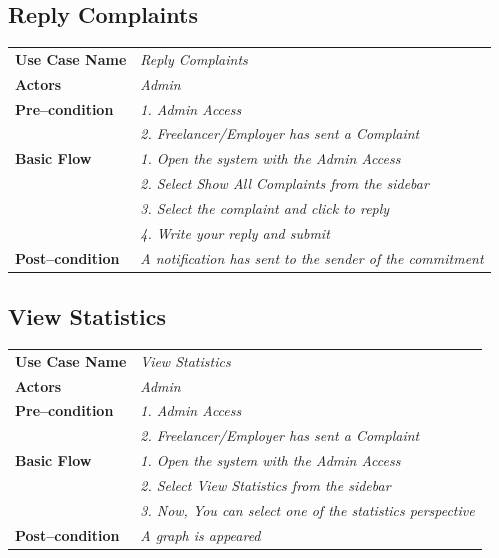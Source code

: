 \documentclass{article}
\begin{document}
\subsection{Reply Complaints}
    \begin{tabular}{ l | l }
    \toprule
      \rowcolor{LightCyan}
      \textbf{Use Case Name}    & \textit{Reply Complaints}\\
      \textbf{Actors}           & \textit{Admin}\\
      \rowcolor{LightCyan}
      \textbf{Pre--condition}   & \textit{1. Admin Access}\\
      \rowcolor{LightCyan}
                                & \textit{2. Freelancer/Employer has sent a Complaint}\\
      \textbf{Basic Flow}       & \textit{1. Open the system with the Admin Access}\\
                                & \textit{2. Select Show All Complaints from the sidebar}\\
                                & \textit{3. Select the complaint and click to reply}\\
                                & \textit{4. Write your reply and submit}\\
      \rowcolor{LightCyan}
      \textbf{Post--condition}  & \textit{A notification has sent to the sender of the commitment}\\
    \toprule
    \end{tabular}


\subsection{View Statistics}
    \begin{tabular}{ l | l }
    \toprule
      \rowcolor{LightCyan}
      \textbf{Use Case Name}    & \textit{View Statistics}\\
      \textbf{Actors}           & \textit{Admin}\\
      \rowcolor{LightCyan}
      \textbf{Pre--condition}   & \textit{1. Admin Access}\\
                                  \rowcolor{LightCyan}
                                & \textit{2. Freelancer/Employer has sent a Complaint}\\
      \textbf{Basic Flow}       & \textit{1. Open the system with the Admin Access}\\
                                & \textit{2. Select View Statistics from the sidebar}\\
                                & \textit{3. Now, You can select one of the statistics perspective}\\
      \rowcolor{LightCyan}
      \textbf{Post--condition}  & \textit{A graph is appeared}\\
    \toprule
    \end{tabular}
\end{document}
